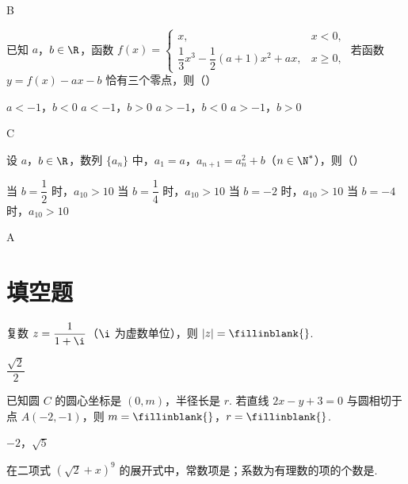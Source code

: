 \begin{answer}
B
\end{answer}

\begin{problem}
已知 \(a\)，\(b\in\R\)，函数 \(f(x)=\begin{cases}
x, & x<0,\\
\dfrac13x^3-\dfrac12(a+1)x^2+ax, & x\ge0,
\end{cases}\) 若函数 \(y=f(x)-ax-b\) 恰有三个零点，则（\quad）

\choices
    {\(a<-1\)，\(b<0\)}
    {\(a<-1\)，\(b>0\)}
    {\(a>-1\)，\(b<0\)}
    {\(a>-1\)，\(b>0\)}
\end{problem}

\begin{answer}
C
\end{answer}

\begin{problem}
设 \(a\)，\(b\in\R\)，数列 \(\{a_n\}\) 中，\(a_1=a\)，\(a_{n+1}=a_n^2+b\)（\(n\in\N^*\)），则（\quad）

\choices
    {当 \(b=\dfrac12\) 时，\(a_{10}>10\)}
    {当 \(b=\dfrac14\) 时，\(a_{10}>10\)}
    {当 \(b=-2\) 时，\(a_{10}>10\)}
    {当 \(b=-4\) 时，\(a_{10}>10\)}
\end{problem}

\begin{answer}
A
\end{answer}

\section{填空题}

\begin{problem}
复数 \(z=\dfrac{1}{1+\i}\)（\(\i\) 为虚数单位），则 \(|z|=\fillinblank{}\).
\end{problem}

\begin{answer}
\(\dfrac{\sqrt{2}}{2}\)
\end{answer}

\begin{problem}
已知圆 \(C\) 的圆心坐标是 \((0,m)\)，半径长是 \(r\). 若直线 \(2x-y+3=0\) 与圆相切于点 \(A(-2,-1)\)，则 \(m=\fillinblank{}\)，\(r=\fillinblank{}\).
\end{problem}

\begin{answer}
\(-2\)，\(\sqrt{5}\)
\end{answer}

\begin{problem}
在二项式 \((\sqrt2+x)^9\) 的展开式中，常数项是\fillinblank{}；系数为有理数的项的个数是\fillinblank{}.
\end{problem}

